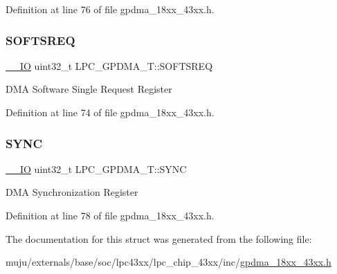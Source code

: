 Definition at line 76 of file gpdma\+\_\+18xx\+\_\+43xx.\+h.

\mbox{\label{struct_l_p_c___g_p_d_m_a___t_a2905a8988cfd38c6e44d121783c0bfe7}} 
\subsubsection{\texorpdfstring{S\+O\+F\+T\+S\+R\+EQ}{SOFTSREQ}}
{\footnotesize\ttfamily \hyperlink{core__sc300_8h_aec43007d9998a0a0e01faede4133d6be}{\+\_\+\+\_\+\+IO} uint32\+\_\+t L\+P\+C\+\_\+\+G\+P\+D\+M\+A\+\_\+\+T\+::\+S\+O\+F\+T\+S\+R\+EQ}

D\+MA Software Single Request Register 

Definition at line 74 of file gpdma\+\_\+18xx\+\_\+43xx.\+h.

\mbox{\label{struct_l_p_c___g_p_d_m_a___t_ac89c20888b14781ead9fe459f8f79853}} 
\subsubsection{\texorpdfstring{S\+Y\+NC}{SYNC}}
{\footnotesize\ttfamily \hyperlink{core__sc300_8h_aec43007d9998a0a0e01faede4133d6be}{\+\_\+\+\_\+\+IO} uint32\+\_\+t L\+P\+C\+\_\+\+G\+P\+D\+M\+A\+\_\+\+T\+::\+S\+Y\+NC}

D\+MA Synchronization Register 

Definition at line 78 of file gpdma\+\_\+18xx\+\_\+43xx.\+h.



The documentation for this struct was generated from the following file\+:\begin{DoxyCompactItemize}
\item 
muju/externals/base/soc/lpc43xx/lpc\+\_\+chip\+\_\+43xx/inc/\hyperlink{gpdma__18xx__43xx_8h}{gpdma\+\_\+18xx\+\_\+43xx.\+h}\end{DoxyCompactItemize}
